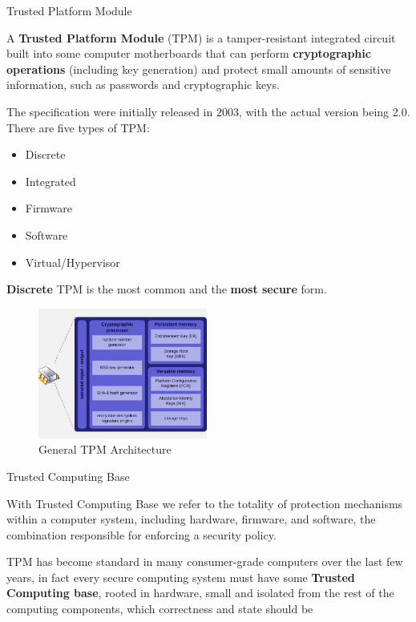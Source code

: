 \begin{section}{Trusted Platform Module}
  \begin{boxH}
    A \textbf{Trusted Platform Module} (TPM) is a tamper-resistant integrated circuit built into
    some computer motherboards that can perform \textbf{cryptographic operations} (including key
    generation) and protect small amounts of sensitive information, such as passwords and
    cryptographic keys.
  \end{boxH}

  The specification were initially released in 2003, with the actual version being 2.0.\\
  There are five types of TPM:
  \begin{itemize}
    \item Discrete
    \item Integrated
    \item Firmware
    \item Software
    \item Virtual/Hypervisor
  \end{itemize}
  \textbf{Discrete} TPM is the most common and the \textbf{most secure} form.
  \begin{figure}[H]
    \centering
    \includegraphics[width=0.5\textwidth]{img/hardware/tcb schema.png}
    \caption{General TPM Architecture}
  \end{figure}
  \begin{subsection}{Trusted Computing Base}
    \begin{boxH}
      With Trusted Computing Base we refer to the totality of protection mechanisms within a
      computer system, including hardware, firmware, and software, the combination responsible for
      enforcing a security policy.
    \end{boxH}
    TPM has become standard in many consumer-grade computers over the last few years, in fact every
    secure computing system must have some \textbf{Trusted Computing base}, rooted in hardware, small
    and isolated from the rest of the computing components, which correctness and state should be

\end{subsection}
\end{section}
